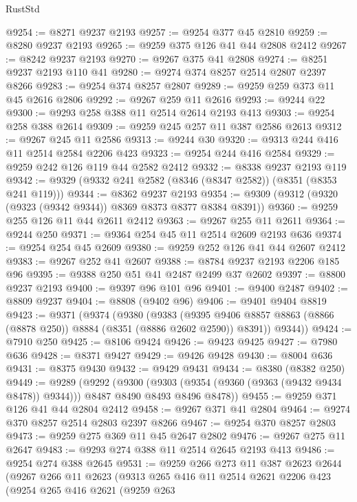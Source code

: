 \begin{lexlean}{RustStd}
\begin{coremodule}
@9254 := @8271 @9237 @2193
@9257 := @9254 @377 @45 @2810
@9259 := @8280 @9237 @2193
@9265 := @9259 @375 @126 @41 @44 @2808 @2412
@9267 := @8242 @9237 @2193
@9270 := @9267 @375 @41 @2808
@9274 := @8251 @9237 @2193 @110 @41
@9280 := @9274 @374 @8257 @2514 @2807 @2397 @8266
@9283 := @9254 @374 @8257 @2807
@9289 := @9259 @259 @373 @11 @45 @2616 @2806
@9292 := @9267 @259 @11 @2616
@9293 := @9244 @22
@9300 := @9293 @258 @388 @11 @2514 @2614 @2193 @413
@9303 := @9254 @258 @388 @2614
@9309 := @9259 @245 @257 @11 @387 @2586 @2613
@9312 := @9267 @245 @11 @2586
@9313 := @9244 @30
@9320 := @9313 @244 @416 @11 @2514 @2584 @2206 @423
@9323 := @9254 @244 @416 @2584
@9329 := @9259 @242 @126 @119 @44 @2582 @2412
@9332 := @8338 @9237 @2193 @119
@9342 := @9329 (@9332 @241 @2582 (@8346 (@8347 @2582)) (@8351 (@8353 @241 @119)))
@9344 := @8362 @9237 @2193
@9354 := @9309 (@9312 (@9320 (@9323 (@9342 @9344)) @8369 @8373 @8377 @8384 @8391))
@9360 := @9259 @255 @126 @11 @44 @2611 @2412
@9363 := @9267 @255 @11 @2611
@9364 := @9244 @250
@9371 := @9364 @254 @45 @11 @2514 @2609 @2193 @636
@9374 := @9254 @254 @45 @2609
@9380 := @9259 @252 @126 @41 @44 @2607 @2412
@9383 := @9267 @252 @41 @2607
@9388 := @8784 @9237 @2193 @2206 @185 @96
@9395 := @9388 @250 @51 @41 @2487 @2499 @37 @2602
@9397 := @8800 @9237 @2193
@9400 := @9397 @96 @101 @96
@9401 := @9400 @2487
@9402 := @8809 @9237
@9404 := @8808 (@9402 @96)
@9406 := @9401 @9404 @8819
@9423 := @9371
    (@9374
      (@9380
        (@9383
          (@9395 @9406 @8857 @8863 (@8866 (@8878 @250)) @8884 (@8351 (@8886 @2602 @2590)) @8391))
        @9344))
@9424 := @7910 @250
@9425 := @8106 @9424
@9426 := @9423 @9425
@9427 := @7980 @636
@9428 := @8371 @9427
@9429 := @9426 @9428
@9430 := @8004 @636
@9431 := @8375 @9430
@9432 := @9429 @9431
@9434 := @8380 (@8382 @250)
@9449 := @9289
    (@9292
      (@9300
        (@9303 (@9354 (@9360 (@9363 (@9432 @9434 @8478)) @9344)))
        @8487
        @8490
        @8493
        @8496
        @8478))
@9455 := @9259 @371 @126 @41 @44 @2804 @2412
@9458 := @9267 @371 @41 @2804
@9464 := @9274 @370 @8257 @2514 @2803 @2397 @8266
@9467 := @9254 @370 @8257 @2803
@9473 := @9259 @275 @369 @11 @45 @2647 @2802
@9476 := @9267 @275 @11 @2647
@9483 := @9293 @274 @388 @11 @2514 @2645 @2193 @413
@9486 := @9254 @274 @388 @2645
@9531 := @9259
    @266
    @273
    @11
    @387
    @2623
    @2644
    (@9267
      @266
      @11
      @2623
      (@9313
        @265
        @416
        @11
        @2514
        @2621
        @2206
        @423
        (@9254
          @265
          @416
          @2621
          (@9259
            @263

\end{coremodule}
\end{lexlean}
